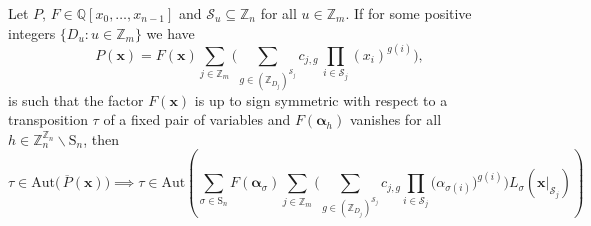 \begin{lemma} \label{lem:symmetrization Lemma}
Let $P,\,F\in\mathbb{Q}\left[x_{0},\ldots,x_{n-1}\right]$
and $\mathscr{S}_{u}\subseteq\mathbb{Z}_{n}$ for all $u\in\mathbb{Z}_{m}$. If for some positive integers $\{D_{u}:u\in\mathbb{Z}_{m}\}$ we have
\begin{equation}
P(\mathbf{x})=F(\mathbf{x})\sum_{j\in\mathbb{Z}_{m}}\big(\sum_{g\in(\mathbb{Z}_{D_{j}})^{\mathscr{S}_{j}}}c_{j,g}\,\prod_{i\in \mathscr{S}_{j}}(x_{i})^{g(i)}\big),
\end{equation}
is such that the factor $F(\mathbf{x})$ is up to sign symmetric with respect to a transposition $\tau$ of a fixed pair of variables and $F(\boldsymbol{\alpha}_{h})$ vanishes for all $h\in \mathbb{Z}_{n}^{\mathbb{Z}_{n}}\backslash\text{S}_{n}$, then
\[
\tau\in\textrm{Aut}\big(\,\overline{P}(\mathbf{x})\big)\implies\tau\in\textrm{Aut}\left(\sum_{\sigma\in\text{S}_{n}}F(\boldsymbol{\alpha}_{\sigma})\sum_{j\in\mathbb{Z}_{m}}\bigg(\sum_{g\in(\mathbb{Z}_{D_{j}})^{\mathscr{S}_{j}}}c_{j,g}\prod_{i\in\mathscr{S}_{j}}\big(\alpha_{\sigma(i)}\big)^{g(i)}\bigg)L_{\sigma}(\mathbf{x}|_{\mathscr{S}_{j}})\right)
\]
\end{lemma}
